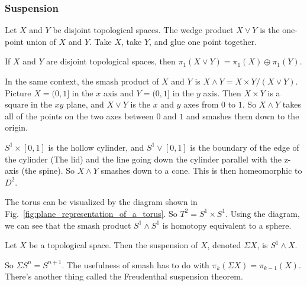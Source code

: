             \subsubsection{Suspension}
                Let $X$ and $Y$ be disjoint topological spaces. The wedge
                product $X\vee Y$ is the one-point union of $X$ and $Y$. Take
                $X$, take $Y$, and glue one point together. 
                \begin{theorem}
                    If $X$ and $Y$ are disjoint topological spaces, then
                    $\pi_{1}(X\vee Y)=\pi_{1}(X)\oplus\pi_{1}(Y)$.
                \end{theorem}
                In the same context, the smash product of $X$ and $Y$ is
                $X\wedge Y=X\times Y/(X\vee Y)$. Picture $X=(0,1]$ in the $x$
                axis and $Y=(0,1]$ in the $y$ axis. Then $X\times Y$ is a
                square in the $xy$ plane, and $X\vee Y$ is the $x$ and $y$ axes
                from $0$ to $1$. So $X\wedge Y$ takes all of the points on the
                two axes between $0$ and $1$ and smashes them down to the
                origin.
                \begin{example}
                    $S^{1}\times [0,1]$ is the hollow cylinder, and
                    $S^{1}\vee [0,1]$ is the boundary of the edge of the
                    cylinder (The lid) and the line going down the cylinder
                    parallel with the z-axis (the spine). So $X\wedge Y$
                    smashes down to a cone. This is then homeomorphic
                    to $D^{2}$. 
                \end{example}
                \begin{example}
                    The torus can be visualized by the diagram shown in
                    Fig.~\ref{fig:plane_representation_of_a_torus}.
                    So $T^{2}=S^{1}\times S^{1}$. Using the diagram, we can see
                    that the smash product $S^{1}\wedge S^{1}$ is homotopy
                    equivalent to a sphere.
                \end{example}
                \begin{definition}
                    Let $X$ be a topological space. Then the suspension of $X$,
                    denoted $\Sigma X$, is $S^{1}\wedge X$.
                \end{definition}
                So $\Sigma S^{n}=S^{n+1}$. The usefulness of smash has to do
                with $\pi_{k}(\Sigma X)=\pi_{k-1}(X)$. There's another thing
                called the Freudenthal suspension theorem.
